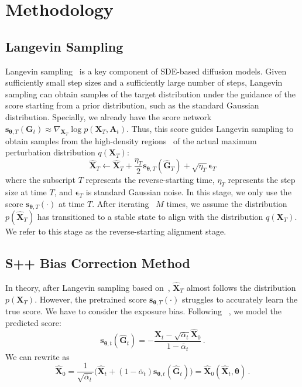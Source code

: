 \documentclass{article}
\newcommand{\s}{{{\bm s}}}
\newcommand{\X}{{{\bm X}}}
\newcommand{\A}{{{\bm A}}}
\newcommand{\G}{{{\bm G}}}
\newcommand{\EPS}{{\bm\epsilon}}
\newcommand{\THETA}{{\bm\theta}}
\begin{document}
\section{Methodology}\label{sec:Methodology}
\subsection{Langevin Sampling}
Langevin sampling~\citep{song2019generative} is a key component of SDE-based diffusion models. Given sufficiently small step sizes and a sufficiently large number of steps, Langevin sampling can obtain samples of the target distribution under the guidance of the score starting from a prior distribution, such as the standard Gaussian distribution. Specially, we already have the score network $\s_{\THETA,T}(\G_t) \approx \nabla_{\X_T} \log p(\X_T,\A_t)$. Thus, this score guides Langevin sampling to obtain samples from the high-density regions~\citep{umdon} of the actual maximum perturbation distribution $q(\X_T)$:
\begin{equation}
\hat{\X}_{T} \leftarrow \hat{\X}_{T}+ \frac{\eta_{T}}2\s_{\THETA,T}(\hat{\G}_{T}) + \sqrt{\eta_{T}}\EPS_T
\label{eq:langevin}
\end{equation}
where the subscript $T$ represents the reverse-starting time, $\eta_{T}$ represents the step size at time $T$, and $\EPS_T$ is standard Gaussian noise. In this stage, we only use the score $\s_{\THETA,T}(\cdot)$ at time $T$. After iterating~ $M$ times, we assume the distribution $p(\hat{\X}_T)$ has transitioned to a stable state to align with the distribution $q(\X_T)$. We refer to this stage as the reverse-starting alignment stage.
\subsection{S++ Bias Correction Method}


In theory, after Langevin sampling based on~, $\hat{\X}_T$ almost follows the distribution $p(\X_T)$. However, the pretrained score $\s_{\THETA,T}(\cdot)$ struggles to accurately learn the true score. We have to consider the exposure bias. Following~\cite{luo2022understanding,xue2024accelerating} , we model the predicted score:
\begin{equation}
\s_{\THETA,t}(\hat{\G}_t) = -\frac{\hat{\X}_t-\sqrt{\bar{\alpha}_t}\hat{\X}_0}{{1-\bar{\alpha}_t}}\,.
\label{eqx2s}
\end{equation}
We can rewrite  as
\begin{equation}
\hat{\X}_0
= \frac1{\sqrt{\bar{\alpha}_t}}\bigl(\hat{\X}_t+({1-\bar{\alpha}_t})\s_{\THETA,t}(\hat{\G}_t)\bigr)=\hat{\X}_0(\hat{\X}_t,\THETA)\,.
\label{eq:x_estimate}
\end{equation}
\end{document}
